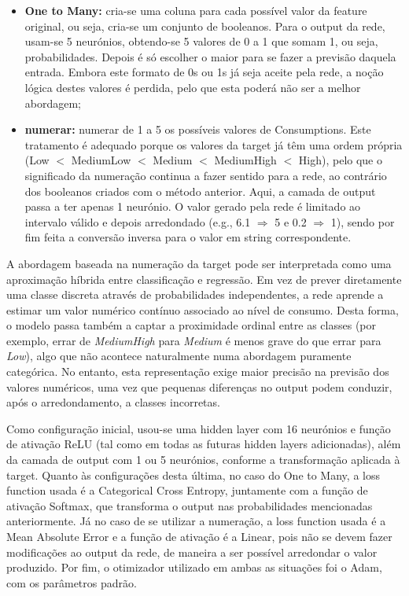 \documentclass[11pt,a4paper]{article}
\newcommand{\code}[1]{{\ttfamily\hyphenchar\font=45\relax #1}}
\begin{document}
\begin{itemize}
    \item \textbf{One to Many:} cria-se uma coluna para cada possível valor da feature original, ou seja, cria-se um conjunto de booleanos. Para o output da rede, usam-se 5 neurónios, obtendo-se 5 valores de 0 a 1 que somam 1, ou seja, probabilidades. Depois é só escolher o maior para se fazer a previsão daquela entrada. Embora este formato de 0s ou 1s já seja aceite pela rede, a noção lógica destes valores é perdida, pelo que esta poderá não ser a melhor abordagem;
    \item \textbf{numerar:} numerar de 1 a 5 os possíveis valores de \code{Consumptions}. Este tratamento é adequado porque os valores da target já têm uma ordem própria (Low $<$ MediumLow $<$ Medium $<$ MediumHigh $<$ High), pelo que o significado da numeração continua a fazer sentido para a rede, ao contrário dos booleanos criados com o método anterior. Aqui, a camada de output passa a ter apenas 1 neurónio. O valor gerado pela rede é limitado ao intervalo válido e depois arredondado (e.g., 6.1 $\Rightarrow$ 5 e 0.2 $\Rightarrow$ 1), sendo por fim feita a conversão inversa para o valor em string correspondente.
\end{itemize}

A abordagem baseada na numeração da target pode ser interpretada como uma aproximação híbrida entre classificação e regressão. Em vez de prever diretamente uma classe discreta através de probabilidades independentes, a rede aprende a estimar um valor numérico contínuo associado ao nível de consumo. Desta forma, o modelo passa também a captar a proximidade ordinal entre as classes (por exemplo, errar de \textit{MediumHigh} para \textit{Medium} é menos grave do que errar para \textit{Low}), algo que não acontece naturalmente numa abordagem puramente categórica. No entanto, esta representação exige maior precisão na previsão dos valores numéricos, uma vez que pequenas diferenças no output podem conduzir, após o arredondamento, a classes incorretas.

Como configuração inicial, usou-se uma hidden layer com 16 neurónios e função de ativação ReLU (tal como em todas as futuras hidden layers adicionadas), além da camada de output com 1 ou 5 neurónios, conforme a transformação aplicada à target. Quanto às configurações desta última, no caso do One to Many, a loss function usada é a Categorical Cross Entropy, juntamente com a função de ativação Softmax, que transforma o output nas probabilidades mencionadas anteriormente. Já no caso de se utilizar a numeração, a loss function usada é a Mean Absolute Error e a função de ativação é a Linear, pois não se devem fazer modificações ao output da rede, de maneira a ser possível arredondar o valor produzido. Por fim, o otimizador utilizado em ambas as situações foi o Adam, com os parâmetros padrão.
\end{document}
